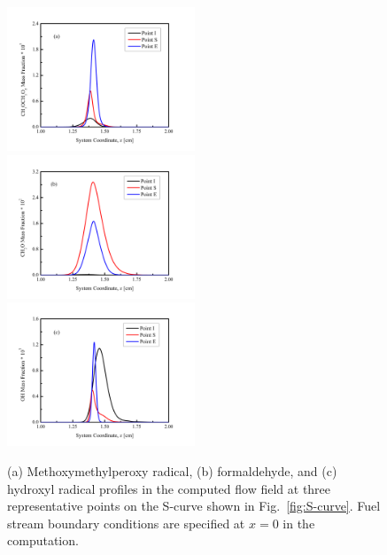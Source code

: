 \documentclass[review,3p,times]{elsarticle}
\begin{document}
\begin{figure}[t]
  \centering
  \scriptsize
  \includegraphics[trim=6.5mm 7.5mm 7mm 8mm, clip=true, width=0.5\textwidth]{sp_a.png}
  \includegraphics[trim=6.5mm 7.5mm 7mm 8mm, clip=true, width=0.5\textwidth]{sp_b.png}
  \includegraphics[trim=6.5mm 7.5mm 7mm 8mm, clip=true, width=0.5\textwidth]{sp_c.png}
  \normalsize
  \caption{(a) Methoxymethylperoxy radical, (b) formaldehyde, and (c) hydroxyl radical profiles in the computed flow field at three representative points on the S-curve shown in Fig.~\ref{fig:S-curve}.  Fuel stream boundary conditions are specified at $x=0$ in the computation.}
  \label{fig:species}
\end{figure}
\end{document}
